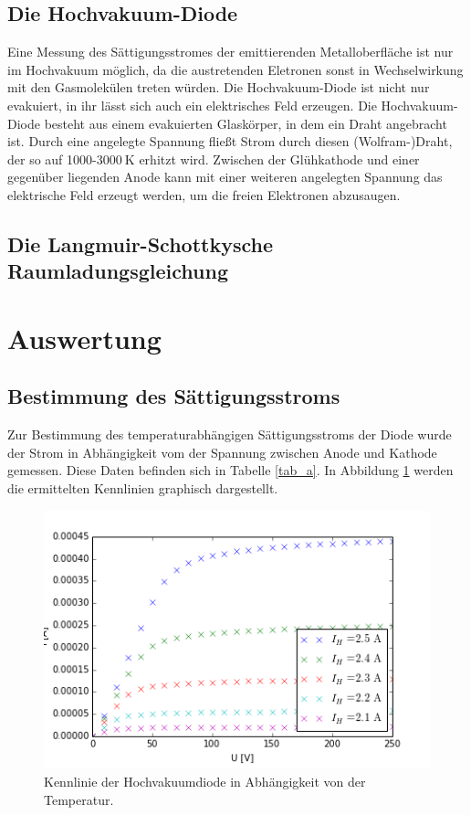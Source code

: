 \documentclass[11pt,ngerman,a4paper]{article}
\begin{document}
\subsection{Die Hochvakuum-Diode}
Eine Messung des Sättigungsstromes der emittierenden Metalloberfläche ist nur im Hochvakuum möglich, da die austretenden Eletronen sonst in Wechselwirkung mit den Gasmolekülen treten würden. Die Hochvakuum-Diode ist nicht nur evakuiert, in ihr lässt sich auch ein elektrisches Feld erzeugen.\newline
Die Hochvakuum-Diode besteht aus einem evakuierten Glaskörper, in dem ein Draht angebracht ist. Durch eine angelegte Spannung fließt Strom durch diesen (Wolfram-)Draht, der so auf 1000-$\SI{3000}{\kelvin}$ erhitzt wird. Zwischen der Glühkathode und einer gegenüber liegenden Anode kann mit einer weiteren angelegten Spannung das elektrische Feld erzeugt werden, um die freien Elektronen abzusaugen.
\subsection{Die Langmuir-Schottkysche Raumladungsgleichung}
\section{Auswertung}
\subsection{Bestimmung des Sättigungsstroms}
Zur Bestimmung des temperaturabhängigen Sättigungsstroms der Diode wurde der Strom in Abhängigkeit vom der Spannung zwischen Anode und Kathode gemessen. Diese Daten befinden sich in Tabelle \ref{tab_a}. In Abbildung \ref{abb_a} werden die ermittelten Kennlinien graphisch dargestellt. 
\begin{figure}[htp]
\centering
\includegraphics[scale=0.8]{plot_a.png}
\caption{Kennlinie der Hochvakuumdiode in Abhängigkeit von der Temperatur.}
\label{abb_a}
\end{figure}
\end{document}

